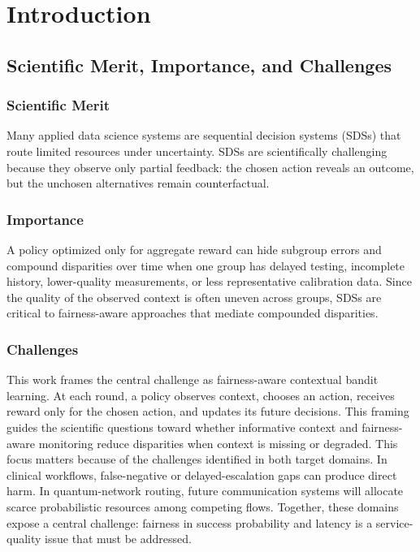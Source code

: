 \section{Introduction}

\subsection{Scientific Merit, Importance, and Challenges}

\subsubsection{Scientific Merit}
Many applied data science systems are sequential decision systems (SDSs) that
route limited resources under uncertainty. SDSs are scientifically challenging
because they observe only partial feedback: the chosen action reveals an
outcome, but the unchosen alternatives remain counterfactual.

\subsubsection{Importance}
A policy optimized only for aggregate reward can hide subgroup errors and
compound disparities over time when one group has delayed testing, incomplete
history, lower-quality measurements, or less representative calibration data.
Since the quality of the observed context is often uneven across groups, SDSs
are critical to fairness-aware approaches that mediate compounded disparities.

\subsubsection{Challenges}
This work frames the central challenge as fairness-aware contextual bandit
learning. At each round, a policy observes context, chooses an action, receives
reward only for the chosen action, and updates its future decisions. This
framing guides the scientific questions toward whether informative context and
fairness-aware monitoring reduce disparities when context is missing or
degraded. This focus matters because of the challenges identified in both
target domains. In clinical workflows, false-negative or delayed-escalation
gaps can produce direct harm. In quantum-network routing, future communication
systems will allocate scarce probabilistic resources among competing flows.
Together, these domains expose a central challenge: fairness in success
probability and latency is a service-quality issue that must be addressed.

